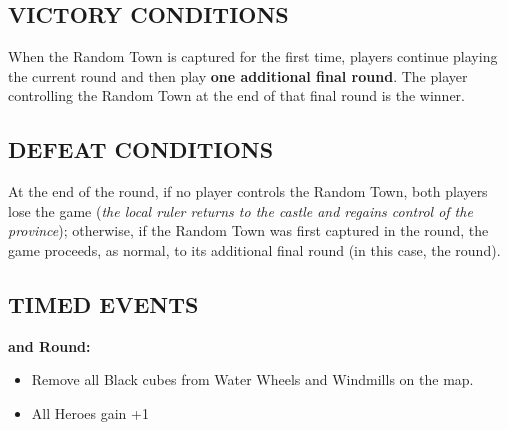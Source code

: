 \begin{multicols*}{2}
\subsection*{\MakeUppercase{Victory Conditions}}
When the Random Town is captured for the first time, players continue playing the current round and then play \textbf{one additional final round}.
The player controlling the Random Town at the end of that final round is the winner.

\subsection*{\MakeUppercase{Defeat Conditions}}
At the end of the  round, if no player controls the Random Town, both players lose the game (\textit{the local ruler returns to the castle and regains control of the province});
otherwise, if the Random Town was first captured in the  round, the game proceeds, as normal, to its additional final round (in this case, the  round).

\subsection*{\MakeUppercase{Timed Events}}

  \textbf{ and  Round:}
\begin{itemize}
  \item Remove all Black cubes from Water Wheels and Windmills on the map.
  \item All Heroes gain +1 
\end{itemize}

\end{multicols*}

